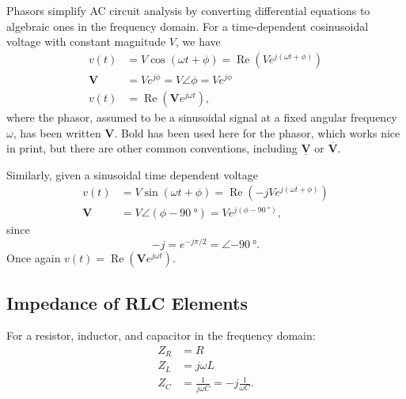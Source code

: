\documentclass[letterpaper]{scrartcl}
\newcommand{\lr}[1]{\left(#1\right)}
\DeclareMathOperator{\Real}{Re}
\newcommand{\phasor}[1]{\mathbf{#1}}
\begin{document}
Phasors simplify AC circuit analysis by converting differential equations to algebraic ones in the frequency domain.  For a time-dependent cosinusoidal voltage with constant magnitude \( V \), we have
\begin{equation}\label{eqn:karlCircuitsCheatSheet:260}
\begin{aligned}
v(t) &= V \cos\lr{ \omega t + \phi } = \Real \lr{ V e^{j \lr{\omega t + \phi} } } \\
\phasor{V} &= V e^{j \phi} = V \angle \phi = V e^{j \phi} \\
v(t) &= \Real \lr{ \phasor{V} e^{j \omega t} },
\end{aligned}
\end{equation}
where the phasor, assumed to be a sinusoidal signal at a fixed angular frequency \( \omega \), has been written \( \phasor{V} \).  Bold has been used here for the phasor, which works nice in print, but there are other common conventions, including \(\underline{\phasor{V}}\) or \(\overline{\phasor{V}}\).

Similarly, given a sinusoidal time dependent voltage
\begin{equation}\label{eqn:karlCircuitsCheatSheet:320}
\begin{aligned}
v(t) &= V \sin\lr{ \omega t + \phi } = \Real \lr{ -j V e^{j\lr{ \omega t + \phi } } } \\
\phasor{V} &= V \angle \lr{ \phi - \SI{90}{\degree}} = V e^{j \lr{ \phi - \SI{90}{\degree}} },
\end{aligned}
\end{equation}
since
\begin{equation}\label{eqn:karlCircuitsCheatSheet:n}
-j = e^{-j \pi/2} = \angle \SI{-90}{\degree}.
\end{equation}
Once again \( v(t) = \Real \lr{ \phasor{V} e^{j \omega t} } \).

\subsection*{Impedance of RLC Elements}
For a resistor, inductor, and capacitor in the frequency domain:
\begin{equation}
\begin{aligned}
Z_R &= R \\
Z_L &= j \omega L \\
Z_C &= \frac{1}{j \omega C} = -j \frac{1}{\omega C}.
\end{aligned}
\end{equation}
\end{document}
